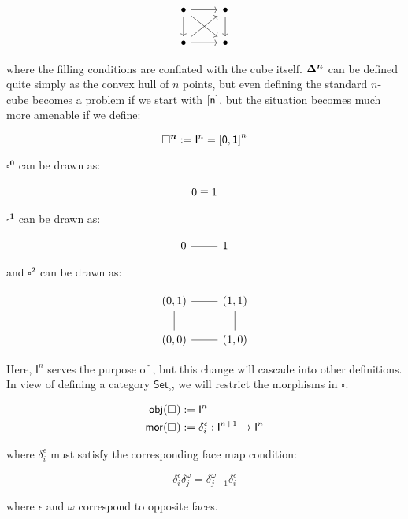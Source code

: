 \documentclass[10pt]{art}
\newcommand{\Cube}[1]{\ensuremath{\boldsymbol{\square^{#1}}}}
\renewcommand{\I}[1]{\ensuremath{\mathsf{I}^{#1}}}
\newcommand{\CSet}{\ensuremath{\mathsf{Set}_{\boldsymbol{\square}}}}
\begin{document}
$$
  \begin{tikzcd}
    \bullet \arrow[r] \arrow[dr] \arrow[d] & \bullet \arrow[d] \\
    \bullet \arrow[r] \arrow[ur] & \bullet
  \end{tikzcd}
$$

where the filling conditions are conflated with the cube itself. $\boldsymbol{\Delta^{n}}$ can be defined quite simply as the convex hull of $n$ points, but even defining the standard $n$-cube becomes a problem if we start with $\mathsf{[n]}$, but the situation becomes much more amenable if we define:

\begin{definition}[\Cube{n}]
  \begin{equation*}
    \Cube{n} := \I{n} = \sq{0, 1}^n
  \end{equation*}
\end{definition}

\begin{example}[$\Cube{0}$, $\Cube{1}$ and $\Cube{2}$]
  $\Cube{0}$ can be drawn as:

  $$
    \begin{tikzcd}
      0 \equiv 1
    \end{tikzcd}
  $$

  $\Cube{1}$ can be drawn as:

  $$
    \begin{tikzcd}
      0 \arrow[r, dash] & 1
    \end{tikzcd}
  $$

  and $\Cube{2}$ can be drawn as:

  $$
    \begin{tikzcd}
      (0, 1) \arrow[r, dash] & (1, 1) \arrow[d, dash] \\
      (0, 0) \arrow[u, dash] & (1, 0) \arrow[l, dash]
    \end{tikzcd}
  $$
\end{example}

Here, $\I{n}$ serves the purpose of , but this change will cascade into other definitions. In view of defining a category \CSet, we will restrict the morphisms in \Cube{}.

\begin{definition}[\Cube{}]
  \begin{align*}
    \obj(\Cube{}) & := \I{n}                                           \\
    \mor(\Cube{}) & := \delta^\epsilon_i : \I{n + 1} \rightarrow \I{n}
  \end{align*}

  where $\delta^\epsilon_i$ must satisfy the corresponding face map condition:

  \begin{equation*}
    \delta^\epsilon_i \delta^\omega_j = \delta^\omega_{j - 1} \delta^\epsilon_i
  \end{equation*}

  where $\epsilon$ and $\omega$ correspond to opposite faces.
\end{definition}
\end{document}

